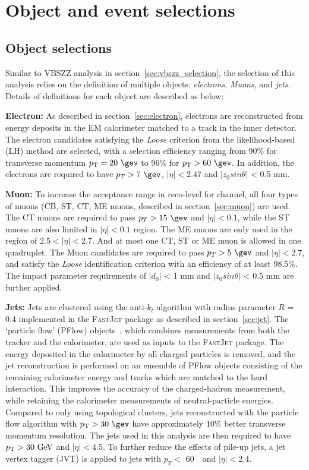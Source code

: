 \section{Object and event selections}
\label{sec:hmhzz_selection}

\subsection{Object selections}
\label{sec:hmhzz_objsel}

Similar to VBSZZ analysis in section~\ref{sec:vbszz_selection}, the selection of this analysis relies on the definition of multiple objects: \textit{electrons}, \textit{Muons}, and \textit{jets}.
Details of definitions for each object are described as below:

\textbf{Electron:}
As described in section~\ref{sec:electron}, electrons are reconstructed from energy deposits in the EM calorimeter matched to a track in the inner detector.
The electron candidates satisfying the \textit{Loose} criterion from the likelihood-based (LH) method are selected,
with a selection efficiency ranging from 90\% for transverse momentum $\pt = 20~\gev$ to 96\% for $\pt > 60~\gev$.
In addition, the electrons are required to have $p_{T} > 7~\gev$, $|\eta| < 2.47$ and $|z_{0} sin\theta|$ < 0.5 mm.

\textbf{Muon:}
To increase the acceptance range in reco-level for \llll channel, all four types of muons
(CB, ST, CT, ME muons, described in section~\ref{sec:muon}) are used.
The CT muons are required to pass $p_{T} > 15~\gev$ and $|\eta| < 0.1$, while the ST muons are also limited in $|\eta| < 0.1$ region.
The ME muons are only used in the region of $2.5 < |\eta| < 2.7$.
And at most one CT, ST or ME muon is allowed in one \llll quadruplet.
The Muon candidates are required to pass $p_{T} > 5~\gev$ and $|\eta| < 2.7$,
and satisfy the \textit{Loose} identification criterion with an efficiency of at least 98.5\%.
The impact parameter requirements of $|d_{0}|$ < 1 mm and $|z_{0} sin\theta|$ < 0.5 mm are further applied.

\textbf{Jets:}
Jets are clustered using the anti-$k_t$ algorithm with radius parameter $R$ = 0.4 implemented in the \textsc{FastJet} package as described in section~\ref{sec:jet}. 
The `particle flow' (PFlow) objects~\cite{PERF-2015-09}, which combines measurements from both the tracker and the calorimeter, are used as inputs to the \textsc{FastJet} package.
The energy deposited in the calorimeter by all charged particles is removed, and the jet reconstruction is performed on an ensemble of PFlow objects
consisting of the remaining calorimeter energy and tracks which are matched to the hard interaction.
This improves the accuracy of the charged-hadron measurement, while retaining the calorimeter measurements of neutral-particle energies. 
Compared to only using topological clusters, jets reconstructed with the particle flow algorithm with $\pt > 30~\gev$ have approximately 10\% better transverse momentum resolution.
The jets used in this analysis are then required to have $p_{\text{T}} > 30~\text{Ge\kern -0.1em V}$ and $|\eta | < 4.5$.
To further reduce the effects of pile-up jets, a jet vertex tagger (JVT) is applied to jets with $p_{T} <$ 60~\gev~and $|\eta| < 2.4$.

